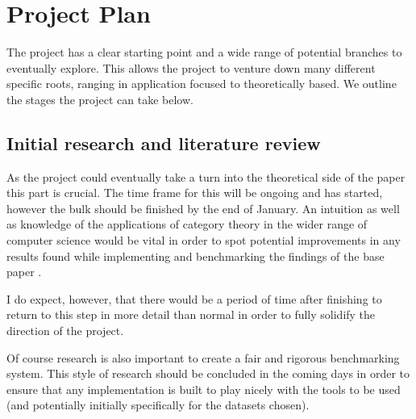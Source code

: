 \chapter{Project Plan} %
\begin{comment}
You should explain what needs to be done in order to complete the project and roughly what you expect the timetable to be. Don’t forget to include the project write-up (the final report), as this is a major part of the exercise. It’s important to identify key milestones and also fall-back positions, in case you run out of time.  You should also identify what extensions could be added if time permits.  The plan should be complete and should include those parts that you have already addressed (make it clear how far you have progressed at the time of writing).  This material will *not* appear in the final report.
\end{comment}

The project has a clear starting point and a wide range of potential branches to eventually explore. This allows the project to venture down many different specific roots, ranging in application focused to theoretically based.
We outline the stages the project can take below.

\section{Initial research and literature review}\label{sec:researchstage}
As the project could eventually take a turn into the theoretical side of the paper \cite{RelationalAlgebraByWayOfAdjunctions} this part is crucial. The time frame for this will be ongoing and has started, however the bulk should be finished by the end of January. An intuition as well as knowledge of the applications of category theory in the wider range of computer science would be vital in order to spot potential improvements in any results found while implementing and benchmarking the findings of the base paper \cite{RelationalAlgebraByWayOfAdjunctions} .

I do expect, however, that there would be a period of time after finishing  to return to this step in more detail than normal in order to fully solidify the direction of the project.

Of course research is also important to create a fair and rigorous benchmarking system. This style of research should be concluded in the coming days in order to ensure that any implementation is built to play nicely with the tools to be used (and potentially initially specifically for the datasets chosen).
